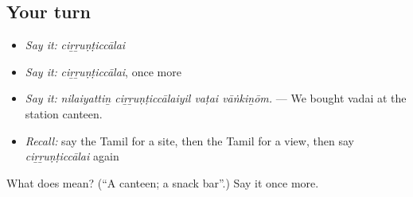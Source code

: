 \subsection*{Your turn}
\begin{itemize}
\raggedright
  \item \emph{Say it:} \emph{ciṟṟuṇṭiccālai}
  \item \emph{Say it:} \emph{ciṟṟuṇṭiccālai}, once more
  \item \emph{Say it:} \emph{nilaiyattiṉ ciṟṟuṇṭiccālaiyil vaṭai vāṅkiṉōm.} — We bought vadai at the station canteen.
  \item \emph{Recall:} say the Tamil for a site, then the Tamil for a view, then say \emph{ciṟṟuṇṭiccālai} again
\end{itemize}

\begin{tcolorbox}[breakable,colback=teal!4,colframe=teal!35!black,title={Before you move on}]
What does  mean? (\textquotedblleft{}A canteen; a snack bar\textquotedblright{}.) Say it once more.
\end{tcolorbox}
